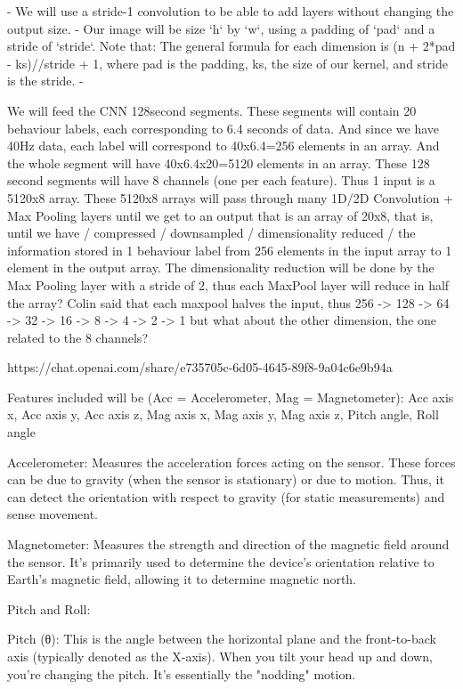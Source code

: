 - We will use a stride-1 convolution to be able to add layers without changing the output size. 
- Our image will be size `h` by `w`, using a padding of `pad` and a stride of `stride`. Note that: The general formula for each dimension is (n + 2*pad - ks)//stride + 1, where pad is the padding, ks, the size of our kernel, and stride is the stride.
- 





We will feed the CNN 128second segments. These segments will contain 20 behaviour labels, each corresponding to 6.4 seconds of data. 
And since we have 40Hz data, each label will correspond to 40x6.4=256 elements in an array. And the whole segment will have 
40x6.4x20=5120 elements in an array. These 128 second segments will have 8 channels (one per each feature). 
Thus 1 input is a 5120x8 array. These 5120x8 arrays will pass through many 1D/2D Convolution + Max Pooling layers until 
we get to an output that is an array of 20x8, that is, until we have / compressed / downsampled / dimensionality reduced / 
the information stored in 1 behaviour label from 256 elements in the input array to 1 element in the output array. 
The dimensionality reduction will be done by the Max Pooling layer with a stride of 2, thus each MaxPool layer
will reduce in half the array? Colin said that each maxpool halves the input, thus 256 -> 128 -> 64 -> 32 -> 16 -> 8 -> 4 -> 2 -> 1 
but what about the other dimension, the one related to the 8 channels?

https://chat.openai.com/share/e735705c-6d05-4645-89f8-9a04c6e9b94a



Features included will be (Acc = Accelerometer, Mag = Magnetometer): 
Acc axis x, 
Acc axis y, 
Acc axis z, 
Mag axis x, 
Mag axis y, 
Mag axis z, 
Pitch angle, 
Roll angle



Accelerometer: Measures the acceleration forces acting on the sensor. These forces can be due to gravity 
(when the sensor is stationary) or due to motion. 
Thus, it can detect the orientation with respect to gravity (for static measurements) and sense movement.

Magnetometer: Measures the strength and direction of the magnetic field around the sensor. 
It's primarily used to determine the device's orientation relative to Earth's magnetic field, allowing 
it to determine magnetic north.

Pitch and Roll:

    Pitch (θ): This is the angle between the horizontal plane and the front-to-back axis (typically 
    denoted as the X-axis). When you tilt your head up and down, you're changing the pitch. It's 
    essentially the "nodding" motion.

